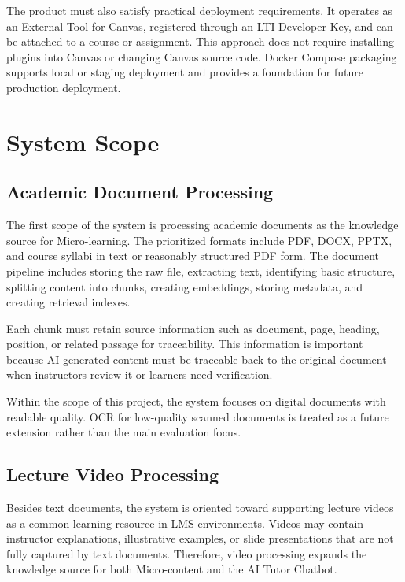 The product must also satisfy practical deployment requirements. It operates as
an External Tool for Canvas, registered through an LTI Developer Key, and can
be attached to a course or assignment. This approach does not require
installing plugins into Canvas or changing Canvas source code. Docker Compose
packaging supports local or staging deployment and provides a foundation for
future production deployment.

\section{System Scope}

\subsection{Academic Document Processing}

The first scope of the system is processing academic documents as the knowledge
source for Micro-learning. The prioritized formats include PDF, DOCX, PPTX,
and course syllabi in text or reasonably structured PDF form. The document
pipeline includes storing the raw file, extracting text, identifying basic
structure, splitting content into chunks, creating embeddings, storing
metadata, and creating retrieval indexes.

Each chunk must retain source information such as document, page, heading,
position, or related passage for traceability. This information is important
because AI-generated content must be traceable back to the original document
when instructors review it or learners need verification.

Within the scope of this project, the system focuses on digital documents with
readable quality. OCR for low-quality scanned documents is treated as a future
extension rather than the main evaluation focus.

\subsection{Lecture Video Processing}

Besides text documents, the system is oriented toward supporting lecture videos
as a common learning resource in LMS environments. Videos may contain
instructor explanations, illustrative examples, or slide presentations that are
not fully captured by text documents. Therefore, video processing expands the
knowledge source for both Micro-content and the AI Tutor Chatbot.

